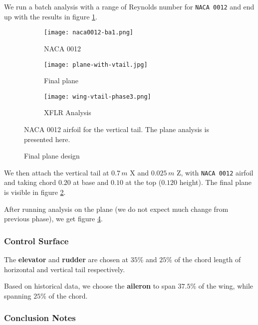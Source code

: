 We run a batch analysis with a range of Reynolds number for \texttt{NACA 0012} and end up with the results in figure \ref{fig:sfig-naca0012-ba}.

\begin{figure}[ht]
    \centering
    \begin{subfigure}[b]{0.3\textwidth}
        \texttt{[image: naca0012-ba1.png]}
        \caption{NACA 0012}
        \label{fig:sfig-naca0012-ba}
    \end{subfigure}
    \begin{subfigure}[b]{0.3\textwidth}
        \texttt{[image: plane-with-vtail.jpg]}
        \caption{Final plane}
        \label{fig:sfig-plane-vtail}
    \end{subfigure}
    \begin{subfigure}[b]{0.3\textwidth}
        \texttt{[image: wing-vtail-phase3.png]}
        \caption{XFLR Analysis}
        \label{fig:sfig-vtail-analysis}
    \end{subfigure}
    \caption{Final plane design}
    \small
        NACA 0012 airfoil for the vertical tail. The plane analysis is presented here.
\end{figure}

We then attach the vertical tail at $0.7\,m$ X and $0.025\,m$ Z, with \texttt{NACA 0012} airfoil and taking chord $0.20$ at base and $0.10$ at the top ($0.120$ height).
The final plane is visible in figure \ref{fig:sfig-plane-vtail}.

After running analysis on the plane (we do not expect much change from previous phase), we get figure \ref{fig:sfig-vtail-analysis}.

\subsubsection*{Control Surface}

The \textbf{elevator} and \textbf{rudder} are chosen at $35\%$ and $25\%$ of the chord length of horizontal and vertical tail respectively.

Based on historical data, we choose the \textbf{aileron} to span $37.5\%$ of the wing, while spanning $25\%$ of the chord.

\subsubsection*{Conclusion Notes}

